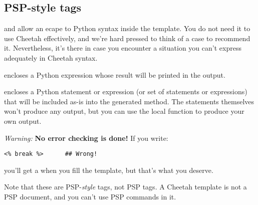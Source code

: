 \subsection{PSP-style tags}
\label{tips.PSP}

\code{<\%= \ldots \%>} and \code{<\%= \ldots \%>} allow an ecape
to Python syntax inside the template.  You do not need it to use Cheetah
effectively, and we're hard pressed to think of a case to recommend it.
Nevertheless, it's there in case you encounter a situation you can't
express adequately in Cheetah syntax.

\code{<\%= \ldots \%>} encloses a Python expression whose result will
be printed in the output.  

\code{<\%= \ldots \%>} encloses a Python statement or expression (or set of
statements or expressions) that will be included as-is into the generated
method.  The statements themselves won't produce any output, but you can use
the local function  to produce your own output.

{\em Warning:} {\bf No error checking is done!}  If you write:
\begin{verbatim}
<% break %>      ## Wrong!
\end{verbatim}
you'll get a  when you fill the template, but that's what you
deserve.

Note that these are PSP-{\em style} tags, not PSP tags.  A Cheetah template
is not a PSP document, and you can't use PSP commands in it.


